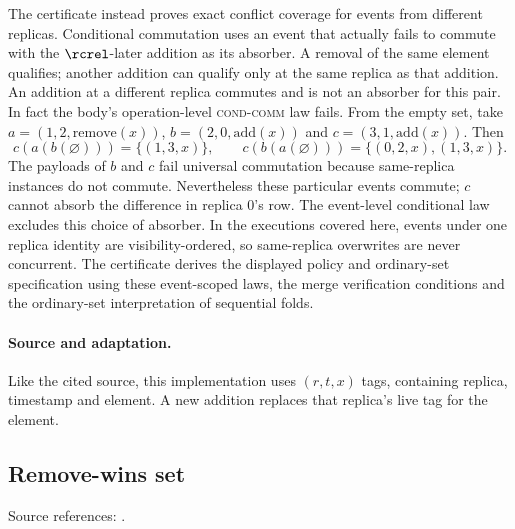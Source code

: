 The certificate instead proves exact conflict coverage for events from
different replicas. Conditional commutation uses an event that actually
fails to commute with the $\rcrel$-later addition as its absorber. A removal
of the same element qualifies; another addition can qualify only at the same
replica as that addition. An addition at a different replica commutes and
is not an absorber for this pair. In fact the body's operation-level
\textsc{cond-comm} law fails. From the empty set, take
$a=(1,2,\mathrm{remove}(x))$, $b=(2,0,\mathrm{add}(x))$ and
$c=(3,1,\mathrm{add}(x))$. Then
\[
c(a(b(\varnothing)))=\{(1,3,x)\},\qquad
c(b(a(\varnothing)))=\{(0,2,x),(1,3,x)\}.
\]
The payloads of $b$ and $c$ fail universal commutation because same-replica
instances do not commute. Nevertheless these particular events commute;
$c$ cannot absorb the difference in replica $0$'s row. The event-level
conditional law excludes this choice of absorber.
In the executions covered here, events under one replica identity are
visibility-ordered, so same-replica overwrites are never concurrent. The
certificate derives the displayed policy and ordinary-set specification
using these event-scoped laws, the merge verification conditions and the
ordinary-set interpretation of sequential folds.

\paragraph{Source and adaptation.}
Like the cited source, this implementation uses
$(r,t,x)$ tags, containing replica, timestamp and element. A new addition
replaces that replica's live tag for the element.

\subsection{Remove-wins set}
\label{app:dt-remove-wins-set}

\noindent Source references: \cite{neem}.







